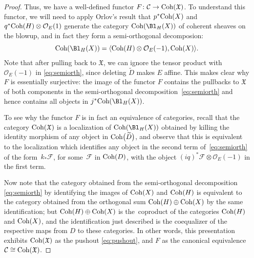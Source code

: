 \documentclass[10pt,a4paper]{amsart}
\numberwithin{equation}{section}
\def\cC{\mathcal{C}}
\def\cO{\mathcal{O}}
\def\cF{\mathcal{F}}
\newcommand\frX{\mathfrak{X}}
\newcommand{\Coh}{\textup{Coh}}
\begin{document}
\begin{proof}
Thus, we have a well-defined functor $F\colon\cC\to \Coh(\frX)$.
To understand this functor,
we will need to apply
Orlov's result \cite{Orl92} that $p^*\Coh(X)$ and $q^*\Coh(H)\otimes\cO_E(1)$ generate the category $\Coh(\Bl_H(X))$ of coherent sheaves on the blowup, and in fact they form a semi-orthogonal decomposion:
\begin{equation}\label{eq:semiorth}
\Coh(\Bl_H(X)) = \langle \Coh(H)\otimes \cO_E(-1), \Coh(X)\rangle.
\end{equation}
Note that after pulling back to $\frX$, we can ignore the tensor
product with $\cO_E(-1)$ in \eqref{eq:semiorth}, since deleting $\widetilde{D}$ makes $E$ affine. This makes clear why $F$ is essentially surjective: the image of the functor $F$ contains the pullbacks to $\frX$ of both components in the semi-orthogonal decomposition~\eqref{eq:semiorth} and hence contains all objects in $j^*\Coh(\Bl_H(X))$.

To see why the functor $F$ is in fact an equivalence of categories, recall that the
category $\Coh(\frX)$ is a localization of $\Coh(\Bl_H(X))$ obtained by killing the identity morphism of any object in $\Coh\big(\widetilde{D}\big)$, and observe that this is equivalent to the localization which identifies any object in the second term of~\eqref{eq:semiorth} of the form~$k_*\cF$, for some~$\cF$ in $\Coh(D)$, with the object $(iq)^*\cF\otimes \cO_E(-1)$ in the first term.

Now note that the
category obtained from the semi-orthogonal decomposition \eqref{eq:semiorth} by identifying the images of $\Coh(X)$ and $\Coh(H)$ is equivalent to the category obtained from the ortho\-go\-nal sum $\Coh(H)\oplus \Coh(X)$ by the same identification;
but $\Coh(H)\oplus \Coh(X)$ is the~co\-pro\-duct of the categories $\Coh(H)$ and $\Coh(X)$, and the identification just described is the coequalizer of the respective maps from $D$ to these categories. In other words, this presentation exhibits $\Coh(\frX)$ as the pushout \eqref{eq:pushout}, and $F$ as the canonical equivalence $\cC\cong \Coh(\frX)$.
\end{proof}
\end{document}

